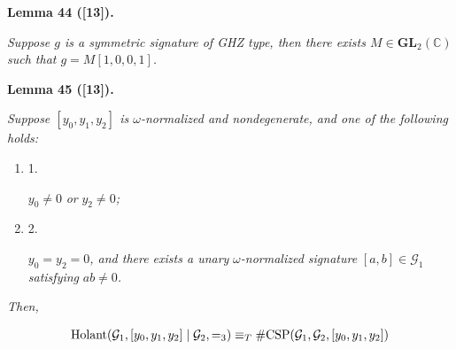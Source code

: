 \documentclass[10pt,a4paper]{article}
\begin{document}


\par\medskip\noindent\textbf{
\textbf{Lemma 44}\textbf{ }([13])\textbf{.}
}\par



\emph{Suppose $g$ is a symmetric signature of GHZ type, then there exists $M\in\mathbf{GL}_{2}(\mathbb{C})$ such that $g=M[1,0,0,1]$.}\par







\par\medskip\noindent\textbf{
\textbf{Lemma 45}\textbf{ }([13])\textbf{.}
}\par



\emph{Suppose $[y_{0},y_{1},y_{2}]$ is $\omega$-normalized and nondegenerate, and one of the following holds:}\par


\begin{enumerate}


\item[] 
1. 


$y_{0}\neq 0$\emph{ or }$y_{2}\neq 0$\emph{;}\par





\item[] 
2. 


$y_{0}=y_{2}=0$\emph{, and there exists a unary }$\omega$\emph{-normalized signature }$[a,b]\in\mathcal{G}_{1}$\emph{ satisfying }$ab\neq 0$\emph{.}\par





\end{enumerate}




\emph{Then,}\par


\[\begin{gathered}
\textup{{Holant}}(\mathcal{G}_{1},[y_{0},y_{1},y_{2}]\mid\mathcal{G}_{2},=_{3})\equiv_{T}\textup{{\#CSP}}(\mathcal{G}_{1},\mathcal{G}_{2},[y_{0},y_{1},y_{2}])
\end{gathered}\]



\end{document}
